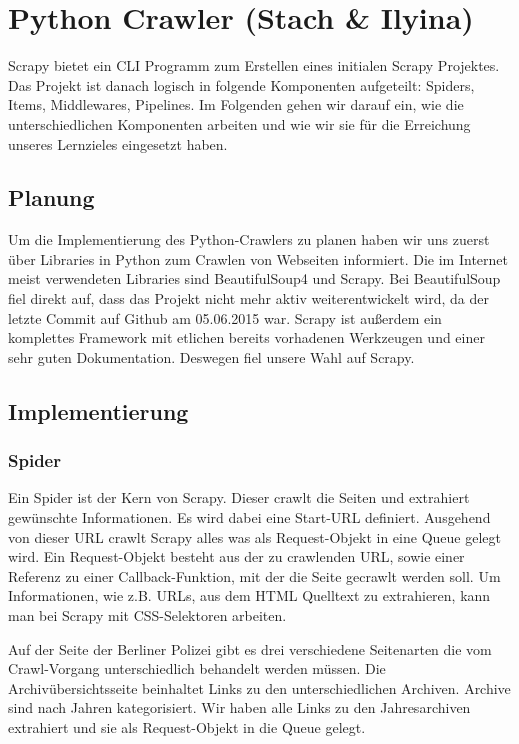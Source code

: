 

\chapter{Python Crawler \small(Stach \& Ilyina)}
\label{ch:Python Crawler}

Scrapy bietet ein CLI Programm zum Erstellen eines initialen Scrapy Projektes.
Das Projekt ist danach logisch in folgende Komponenten aufgeteilt: Spiders, Items, Middlewares, Pipelines.
Im Folgenden gehen wir darauf ein, wie die unterschiedlichen Komponenten arbeiten und wie wir sie für die
Erreichung unseres Lernzieles eingesetzt haben.

\section{Planung}

Um die Implementierung des Python-Crawlers zu planen haben wir uns zuerst
über Libraries in Python zum Crawlen von Webseiten informiert. Die im
Internet meist verwendeten Libraries sind BeautifulSoup4\cite{beausoup}
und Scrapy\cite{scrapy}. Bei BeautifulSoup fiel direkt auf, dass das Projekt
nicht mehr aktiv weiterentwickelt wird, da der letzte Commit auf Github am
05.06.2015 war. Scrapy ist außerdem ein komplettes Framework mit etlichen
bereits vorhadenen Werkzeugen und einer sehr guten Dokumentation. Deswegen
fiel unsere Wahl auf Scrapy.

\section{Implementierung}

\subsection{Spider}

Ein Spider ist der Kern von Scrapy. Dieser crawlt die Seiten und extrahiert gewünschte Informationen.
Es wird dabei eine Start-URL definiert. Ausgehend von dieser URL crawlt Scrapy alles was als Request-Objekt in
eine Queue gelegt wird. Ein Request-Objekt besteht aus der zu crawlenden URL, sowie einer Referenz zu einer Callback-Funktion,
mit der die Seite gecrawlt werden soll. Um Informationen, wie z.B. URLs, aus dem HTML Quelltext zu extrahieren, kann man bei Scrapy
mit CSS-Selektoren arbeiten.

Auf der Seite der Berliner Polizei gibt es drei verschiedene Seitenarten die vom Crawl-Vorgang
unterschiedlich behandelt werden müssen. Die Archivübersichtsseite beinhaltet Links zu den unterschiedlichen Archiven.
Archive sind nach Jahren kategorisiert. Wir haben alle Links zu den Jahresarchiven extrahiert und sie als Request-Objekt in die Queue gelegt.

